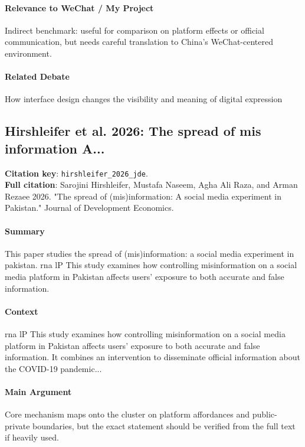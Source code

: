 \documentclass[12pt]{article}
\begin{document}
\paragraph{Relevance to WeChat / My Project} Indirect benchmark: useful for comparison on platform effects or official communication, but needs careful translation to China's WeChat-centered environment.

\paragraph{Related Debate} How interface design changes the visibility and meaning of digital expression


\subsection{Hirshleifer et al. 2026: The spread of mis information A...}
\textbf{Citation key}: \texttt{hirshleifer\_2026\_jde}.\\
\textbf{Full citation}: Sarojini Hirshleifer, Mustafa Naseem, Agha Ali Raza, and Arman Rezaee 2026. "The spread of (mis)information: A social media experiment in Pakistan." Journal of Development Economics.

\paragraph{Summary} This paper studies the spread of (mis)information: a social media experiment in pakistan. rna lP This study examines how controlling misinformation on a social media platform in Pakistan affects users' exposure to both accurate and false information.

\paragraph{Context} rna lP This study examines how controlling misinformation on a social media platform in Pakistan affects users' exposure to both accurate and false information. It combines an intervention to disseminate official information about the COVID-19 pandemic...

\paragraph{Main Argument} Core mechanism maps onto the cluster on platform affordances and public-private boundaries, but the exact statement should be verified from the full text if heavily used.
\end{document}
